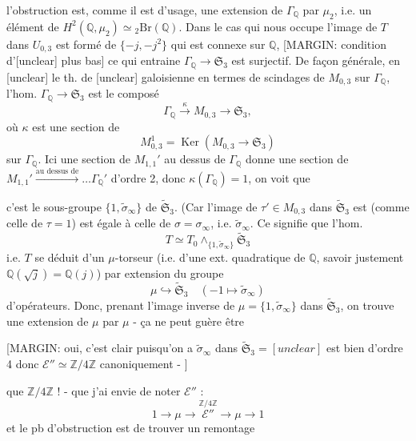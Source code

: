 \begin{enumerate}
l'obstruction est, comme il est d'usage, une
extension de $\Gamma_{\mathbb{Q}}$ par $\mu_2$, i.e. un élément
de $H^2(\mathbb{Q}, \mu_2) \simeq {}_2\text{Br}(\mathbb{Q})$. Dans le cas
qui nous occupe l'image de $T$ dans $U_{0,3}$
est formé de $\{ -j, -j^2 \}$ qui est connexe sur $\mathbb{Q}$,
[MARGIN: condition d'[unclear] plus bas]
ce qui entraine $\Gamma_{\mathbb{Q}} \to \mathfrak{S}_3$ est surjectif. De façon
générale, en [unclear] le th. de [unclear]
galoisienne en termes de scindages
de $M_{0,3}$ sur $\Gamma_{\mathbb{Q}}$, l'hom. $\Gamma_{\mathbb{Q}} \to \mathfrak{S}_3$
est le composé
$$ \Gamma_{\mathbb{Q}} \xrightarrow{\kappa} M_{0,3} \to \mathfrak{S}_3 ,$$
où $\kappa$ est une section de
$$ M_{0,3}^1 = \operatorname{Ker}(M_{0,3} \to \mathfrak{S}_3) $$
sur $\Gamma_{\mathbb{Q}}$. Ici une section de
$M_{1,1}'$ au dessus de $\Gamma_{\mathbb{Q}}$ donne une section de
$M_{1,1}' \xrightarrow{\text{au dessus de}} \dots \Gamma_{\mathbb{Q}}'$ d'ordre 2,
donc $\kappa(\Gamma_{\mathbb{Q}}) = 1$, on voit que

\newpage


c'est le sous-groupe $\{1, \tilde{\sigma}_\infty\}$ de $\widetilde{\mathfrak{S}}_3$. (Car l'image de
$\tau' \in M_{0,3}$ dans $\widetilde{\mathfrak{S}}_3$ est (comme celle de $\tau = 1$)
est égale à celle de $\sigma = \sigma_\infty$, i.e. $\tilde{\sigma}_\infty$. Ce signifie
que l'hom.
$$T \simeq T_0 \wedge_{\{1, \tilde{\sigma}_\infty\}} \widetilde{\mathfrak{S}}_3$$
i.e. $T$ se déduit d'un $\mu$-torseur (i.e. d'une
ext. quadratique de $\mathbb{Q}$, savoir justement
$\mathbb{Q}(\sqrt{j}) = \mathbb{Q}(j)$) par extension du groupe
$$ \mu \hookrightarrow \widetilde{\mathfrak{S}}_3 \quad (-1 \mapsto \tilde{\sigma}_\infty)$$
d'opérateurs. Donc, prenant l'image inverse
de $\mu = \{1, \tilde{\sigma}_\infty\}$ dans $\widetilde{\mathfrak{S}}_3$, on trouve une
extension de $\mu$ par $\mu$ - ça ne peut guère être

[MARGIN: oui, c'est clair puisqu'on a $\tilde{\sigma}_\infty$ dans $\widetilde{\mathfrak{S}}_3 = [unclear]$ est bien d'ordre 4 donc $\mathcal{E}'' \simeq \mathbb{Z}/4\mathbb{Z}$ canoniquement - ]

que $\mathbb{Z}/4\mathbb{Z}$ ! - que j'ai envie de noter
$\mathcal{E}''$ :
$$1 \to \mu \to \overset{\mathbb{Z}/4\mathbb{Z}}{\mathcal{E}''} \to \mu \to 1$$
et le pb d'obstruction est de
trouver un remontage



\end{enumerate}
